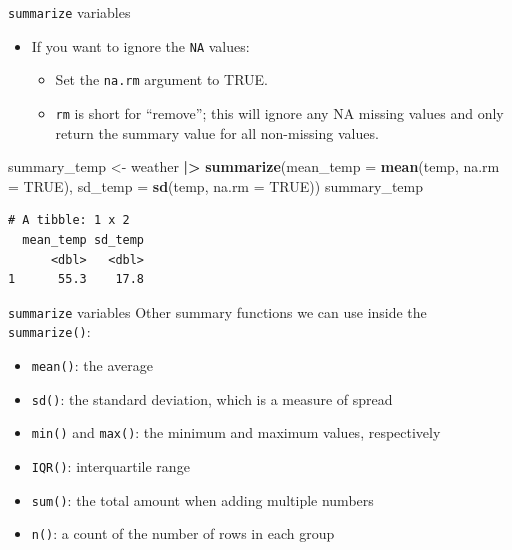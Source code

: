 \documentclass[
  ignorenonframetext,
]{beamer}
\newenvironment{Shaded}{\begin{snugshade}}{\end{snugshade}}
\newcommand{\AttributeTok}[1]{\textcolor[rgb]{0.13,0.29,0.53}{#1}}
\newcommand{\ConstantTok}[1]{\textcolor[rgb]{0.56,0.35,0.01}{#1}}
\newcommand{\FunctionTok}[1]{\textcolor[rgb]{0.13,0.29,0.53}{\textbf{#1}}}
\newcommand{\NormalTok}[1]{#1}
\newcommand{\OtherTok}[1]{\textcolor[rgb]{0.56,0.35,0.01}{#1}}
\newcommand{\SpecialCharTok}[1]{\textcolor[rgb]{0.81,0.36,0.00}{\textbf{#1}}}
\providecommand{\tightlist}{%
  \setlength{\itemsep}{0pt}\setlength{\parskip}{0pt}}
\begin{document}
\begin{frame}[fragile]{\texttt{summarize} variables}
\label{summarize-variables-2}
\begin{itemize}
\item
  If you want to ignore the \texttt{NA} values:

  \begin{itemize}
  \tightlist
  \item
    Set the \texttt{na.rm} argument to TRUE.
  \item
    \texttt{rm} is short for ``remove''; this will ignore any NA missing
    values and only return the summary value for all non-missing values.
  \end{itemize}
\end{itemize}

\normalsize

\begin{Shaded}
\begin{Highlighting}[]
\NormalTok{summary\_temp }\OtherTok{\textless{}{-}}\NormalTok{ weather }\SpecialCharTok{|\textgreater{}} 
  \FunctionTok{summarize}\NormalTok{(}\AttributeTok{mean\_temp =} \FunctionTok{mean}\NormalTok{(temp, }\AttributeTok{na.rm =} \ConstantTok{TRUE}\NormalTok{), }
            \AttributeTok{sd\_temp =} \FunctionTok{sd}\NormalTok{(temp, }\AttributeTok{na.rm =} \ConstantTok{TRUE}\NormalTok{))}
\NormalTok{summary\_temp}
\end{Highlighting}
\end{Shaded}

\begin{verbatim}
# A tibble: 1 x 2
  mean_temp sd_temp
      <dbl>   <dbl>
1      55.3    17.8
\end{verbatim}

\normalsize
\end{frame}

\begin{frame}[fragile]{\texttt{summarize} variables}
\label{summarize-variables-3}
Other summary functions we can use inside the \texttt{summarize()}:

\begin{itemize}
\tightlist
\item
  \texttt{mean()}: the average
\item
  \texttt{sd()}: the standard deviation, which is a measure of spread
\item
  \texttt{min()} and \texttt{max()}: the minimum and maximum values,
  respectively
\item
  \texttt{IQR()}: interquartile range
\item
  \texttt{sum()}: the total amount when adding multiple numbers
\item
  \texttt{n()}: a count of the number of rows in each group
\end{itemize}
\end{frame}
\end{document}
